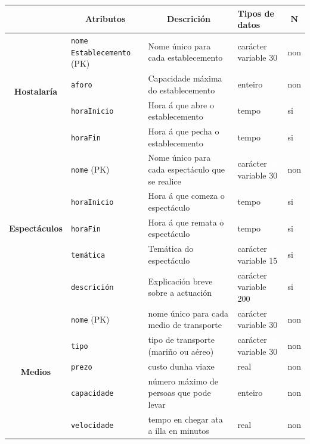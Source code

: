 \documentclass[12pt,a4paper]{book}
\theoremstyle{definition}
\theoremstyle{break}
\begin{document}
\newpage


\begin{table} [H] \centering
	\begin{tabular}{|c|m{3cm}|m{4cm}|m{2cm}|m{0.7cm}|}
	\hline \rowcolor{gris}
	\multicolumn{1}{|m{2.5cm}|}{Entidade ou relación} & \multicolumn{1}{c|}{Atributos} & \multicolumn{1}{c|}{Descrición} & \multicolumn{1}{m{2cm}|}{Tipos de datos} & \multicolumn{1}{c|}{$\mathbf{N}$} \\
	\hline
	\multirow{4}{*}{\textbf{Hostalaría}} & \texttt{nome Establecemento} (PK) & Nome único para cada establecemento &  carácter \textcolor{white}{aa} variable 30 & non \\
	\cline{2-5}
	& \texttt{aforo} & Capacidade máxima do establecemento & enteiro & non \\
	\cline{2-5}
	& \texttt{horaInicio} & Hora á que abre o establecemento & tempo & si \\
	\cline{2-5}
	& \texttt{horaFin} & Hora á que pecha o establecemento & tempo & si \\
	\hline
	\multirow{5}{*}{\textbf{Espectáculos}} & \texttt{nome} (PK) & Nome único para cada espectáculo que se realice &  carácter \textcolor{white}{aa} variable 30 & non \\
	\cline{2-5}
	 & \texttt{horaInicio} & Hora á que comeza o espectáculo & tempo & si \\
	\cline{2-5}
	 & \texttt{horaFin} & Hora á que remata o espectáculo & tempo & si \\
	\cline{2-5}
	 & \texttt{temática} & Temática do espectáculo &  carácter \textcolor{white}{aa} variable 15 & si \\
	\cline{2-5}
	 & \texttt{descrición} & Explicación breve sobre a actuación &  carácter \textcolor{white}{aa} variable 200 & si \\
	\hline
	\multirow{5}{*}{\textbf{Medios}} & \texttt{nome} (PK) & nome único para cada medio de transporte &  carácter \textcolor{white}{aa} variable 30 & non\\
	\cline{2-5}
	& \texttt{tipo} & tipo de transporte (mariño ou aéreo) &  carácter \textcolor{white}{aa} variable 30 & non\\
	\cline{2-5}
	&\texttt{prezo} & custo dunha viaxe & real & non\\
	\cline{2-5}
	&\texttt{capacidade} & número máximo de persoas que pode levar & enteiro & non\\
	\cline{2-5}
	&\texttt{velocidade} & tempo en chegar ata a illa en minutos & real & non\\
	\hline
	\end{tabular}
\end{table}
\end{document}
